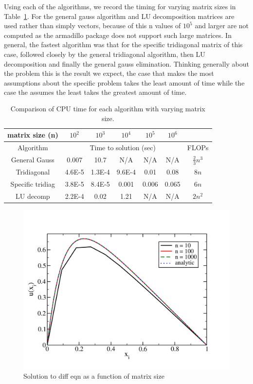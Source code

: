 \documentclass[prc,amsmath,twocolumn,superscriptaddress]{revtex4}
\begin{document}
Using each of the algorithms, we record the timing for varying matrix sizes in Table~\ref{time_table}. For the general gauss algorithm and LU decomposition matrices are used rather than simply vectors, because of this n values of $10^5$ and larger are not computed as the armadillo package does not support such large matrices. In general, the fastest algorithm was that for the specific tridiagonal matrix of this case, followed closely by the general tridiagonal algorithm, then LU decomposition and finally the general gauss elimination. Thinking generally about the problem this is the result we expect, the case that makes the most assumptions about the specific problem takes the least amount of time while the case the assumes the least takes the greatest amount of time.\\

\begin{table}[t]
\centering
\begin{tabular}{|c|c|c|c|c|c|c|}
\hline
matrix size (n)&$10^2$& $10^3$& $10^4$&  $10^5$& $10^6$&\\
\hline
Algorithm&\multicolumn{5}{|c|}{Time to solution (sec)}&FLOPs \\
\hline
General Gauss&0.007&10.7&N/A&N/A&N/A&$\frac{2}{3}n^3$\\
Tridiagonal &4.6E-5&1.3E-4&9.6E-4&0.01&0.08&$8n$\\
Specific tridiag&3.8E-5&8.4E-5&0.001&0.006&0.065&$6n$\\
LU  decomp&2.2E-4&0.02&1.21&N/A&N/A&$2n^2$\\
\hline
\end{tabular}
\caption{Comparison of CPU time for each algorithm with varying matrix size.}
\label{time_table}
\end{table}

\begin{figure}[b]
\includegraphics[scale=0.33]{output}
\caption{Solution to diff eqn as a function of matrix size}
\label{output}
\end{figure}
\end{document}

